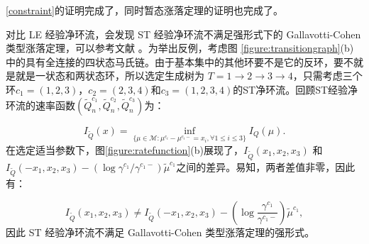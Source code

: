 \ref{constraint}的证明完成了，同时暂态涨落定理的证明也完成了。









对比 LE 经验净环流，会发现 ST 经验净环流不满足强形式下的 Gallavotti-Cohen 类型涨落定理，可以参考文献 \cite{mehl2012role,polettini2017effective,uhl2018fluctuations,kahlen2018hidden}。为举出反例，考虑图 \ref{figure:transitiongraph}(b) 中的具有全连接的四状态马氏链。由于基本集中的其他环要不是它的反环，要不就是就是一状态和两状态环，所以选定生成树为 $T=1\to2\to3\to4$，只需考虑三个环$c_1=(1,2,3)$，$c_2=(2,3,4)$和$c_3=(1,2,3,4)$的ST净环流。回顾ST经验净环流的速率函数$(\tilde{Q}_n^{c_1}, \tilde{Q}_n^{c_2}, \tilde{Q}_n^{c_3})$为：


\begin{equation}
	I_{\tilde{Q}}(x)=\inf_{\{\mu\in\mathcal{M}:\mu^{c_i}-\mu^{c_i-}= x_i,\forall 1\le i\le 3\}}I_Q(\mu).
\end{equation}
在选定适当参数下，图\ref{figure:ratefunction}(b)展现了，$I_{\tilde{Q}}(x_1, x_2, x_3)$ 和 $ I_{\tilde{Q}}(-x_1, x_2, x_3) -\left(\log \gamma^{c_1} / \gamma^{c_1-}\right)\tilde{\mu}^{c_1}$之间的差异。易知，两者差值非零，因此有：

\begin{equation}
    I_{\tilde{Q}}(x_1, x_2, x_3) \neq I_{\tilde{Q}}(-x_1, x_2, x_3) -\left(\log\frac{\gamma^{c_1}}{\gamma^{c_1-}}\right)\tilde{\mu}^{c_1},
\end{equation}
因此 ST 经验净环流不满足 Gallavotti-Cohen 类型涨落定理的强形式。